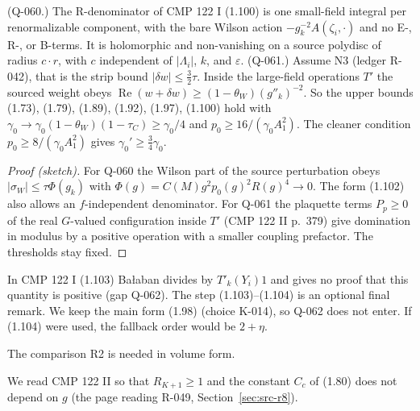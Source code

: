 \begin{proposition}\label{src:FX-O23}
(Q-060.) The R-denominator of CMP 122 I (1.100) is one small-field integral per renormalizable component, with the bare Wilson action $-g_k^{-2}A(\zeta_i,\cdot)$ and no E-, R-, or B-terms. It is holomorphic and non-vanishing on a source polydisc of radius $c\cdot r$, with $c$ independent of $|\Lambda_i|$, $k$, and $\varepsilon$.
(Q-061.) Assume N3 (ledger R-042), that is the strip bound $|\delta w|\le\tfrac32\tau$. Inside the large-field operations $T'$ the sourced weight obeys $\operatorname{Re}(w+\delta w)\ge(1-\theta_W)(g''_k)^{-2}$. So the upper bounds (1.73), (1.79), (1.89), (1.92), (1.97), (1.100) hold with $\gamma_0\to\gamma_0(1-\theta_W)(1-\tau_C)\ge\gamma_0/4$ and $p_0\ge16/(\gamma_0A_1^2)$. The cleaner condition $p_0\ge8/(\gamma_0A_1^2)$ gives $\gamma_0'\ge\tfrac34\gamma_0$.
\end{proposition}
\begin{proof}[Proof (sketch)]
For Q-060 the Wilson part of the source perturbation obeys $|\sigma_W|\le\tau\Phi(g_k)$ with $\Phi(g)=C(M)g^2p_0(g)^2R(g)^4\to0$. The form (1.102) also allows an $f$-independent denominator. For Q-061 the plaquette terms $P_p\ge0$ of the real $G$-valued configuration inside $T'$ (CMP 122 II p.~379) give domination in modulus by a positive operation with a smaller coupling prefactor. The thresholds stay fixed.
\end{proof}
\begin{remark}
In CMP 122 I (1.103) Ba{\l}aban divides by $T'_k(Y_i)1$ and gives no proof that this quantity is positive (gap Q-062). The step (1.103)--(1.104) is an optional final remark. We keep the main form (1.98) (choice K-014), so Q-062 does not enter. If (1.104) were used, the fallback order would be $2+\eta$.
\end{remark}

The comparison R2 is needed in volume form.

\begin{convention}\label{conv:src-R2}
We read CMP 122 II so that $R_{K+1}\ge1$ and the constant $C_c$ of (1.80) does not depend on $g$ (the page reading R-049, Section~\ref{sec:src-r8}).
\end{convention}


